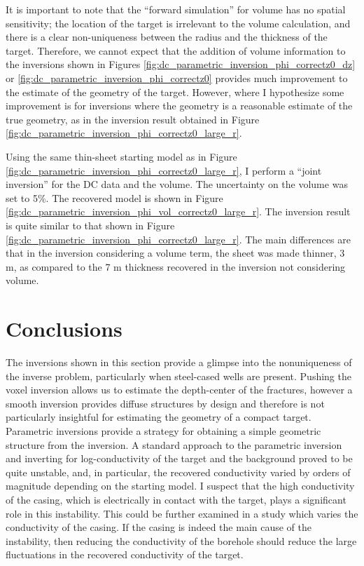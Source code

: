 It is important to note that the ``forward simulation'' for volume has no spatial sensitivity; the location of the target is irrelevant to the volume calculation, and there is a clear non-uniqueness between the radius and the thickness of the target. Therefore, we cannot expect that the addition of volume information to the inversions shown in Figures \ref{fig:dc_parametric_inversion_phi_correctz0_dz} or \ref{fig:dc_parametric_inversion_phi_correctz0} provides much improvement to the estimate of the geometry of the target. However, where I hypothesize some improvement is for inversions where the geometry is a reasonable estimate of the true geometry, as in the inversion result obtained in Figure \ref{fig:dc_parametric_inversion_phi_correctz0_large_r}.

Using the same thin-sheet starting model as in Figure \ref{fig:dc_parametric_inversion_phi_correctz0_large_r}, I perform a ``joint inversion'' for the DC data and the volume. The uncertainty on the volume was set to 5\%. The recovered model is shown in Figure \ref{fig:dc_parametric_inversion_phi_vol_correctz0_large_r}. The inversion result is quite similar to that shown in Figure \ref{fig:dc_parametric_inversion_phi_correctz0_large_r}. The main differences are that in the inversion considering a volume term, the sheet was made thinner, 3 m, as compared to the 7 m thickness recovered in the inversion not considering volume.




\section{Conclusions}
The inversions shown in this section provide a glimpse into the nonuniqueness of the inverse problem, particularly when steel-cased wells are present. Pushing the voxel inversion allows us to estimate the depth-center of the fractures, however a smooth inversion provides diffuse structures by design and therefore is not particularly insightful for estimating the geometry of a compact target. Parametric inversions provide a strategy for obtaining a simple geometric structure from the inversion. A standard approach to the parametric inversion and inverting for log-conductivity of the target and the background proved to be quite unstable, and, in particular, the recovered conductivity varied by orders of magnitude depending on the starting model. I suspect that the high conductivity of the casing, which is electrically in contact with the target, plays a significant role in this instability. This could be further examined in a study which varies the conductivity of the casing. If the casing is indeed the main cause of the instability, then reducing the conductivity of the borehole should reduce the large fluctuations in the recovered conductivity of the target.

